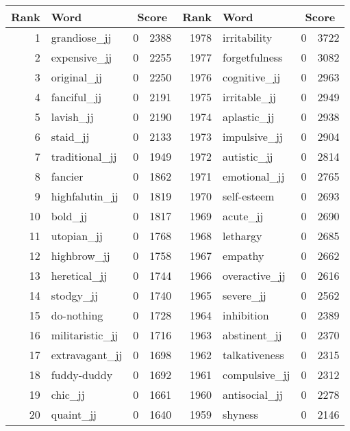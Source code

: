 \begin{table}[tbp]
    \begin{tabular}{| rlr@{.}l | rlr@{.}l |}
    \hline
    \textbf{Rank} & \textbf{Word} & \multicolumn{2}{c|}{\textbf{Score}} & \textbf{Rank} & \textbf{Word} & \multicolumn{2}{c|}{\textbf{Score}} \\
    \hline
    1 & grandiose\_jj & 0 & 2388    &    1978 & irritability & 0 & 3722 \\
    2 & expensive\_jj & 0 & 2255    &    1977 & forgetfulness & 0 & 3082 \\
    3 & original\_jj & 0 & 2250    &    1976 & cognitive\_jj & 0 & 2963 \\
    4 & fanciful\_jj & 0 & 2191    &    1975 & irritable\_jj & 0 & 2949 \\
    5 & lavish\_jj & 0 & 2190    &    1974 & aplastic\_jj & 0 & 2938 \\
    6 & staid\_jj & 0 & 2133    &    1973 & impulsive\_jj & 0 & 2904 \\
    7 & traditional\_jj & 0 & 1949    &    1972 & autistic\_jj & 0 & 2814 \\
    8 & fancier & 0 & 1862    &    1971 & emotional\_jj & 0 & 2765 \\
    9 & highfalutin\_jj & 0 & 1819    &    1970 & self-esteem & 0 & 2693 \\
    10 & bold\_jj & 0 & 1817    &    1969 & acute\_jj & 0 & 2690 \\
    11 & utopian\_jj & 0 & 1768    &    1968 & lethargy & 0 & 2685 \\
    12 & highbrow\_jj & 0 & 1758    &    1967 & empathy & 0 & 2662 \\
    13 & heretical\_jj & 0 & 1744    &    1966 & overactive\_jj & 0 & 2616 \\
    14 & stodgy\_jj & 0 & 1740    &    1965 & severe\_jj & 0 & 2562 \\
    15 & do-nothing & 0 & 1728    &    1964 & inhibition & 0 & 2389 \\
    16 & militaristic\_jj & 0 & 1716    &    1963 & abstinent\_jj & 0 & 2370 \\
    17 & extravagant\_jj & 0 & 1698    &    1962 & talkativeness & 0 & 2315 \\
    18 & fuddy-duddy & 0 & 1692    &    1961 & compulsive\_jj & 0 & 2312 \\
    19 & chic\_jj & 0 & 1661    &    1960 & antisocial\_jj & 0 & 2278 \\
    20 & quaint\_jj & 0 & 1640    &    1959 & shyness & 0 & 2146 \\

\end{tabular}
\end{table}

